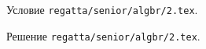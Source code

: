 \problem
Условие \texttt{regatta/senior/algbr/2.tex}.

\solution Решение \texttt{regatta/senior/algbr/2.tex}.
\endproblem

